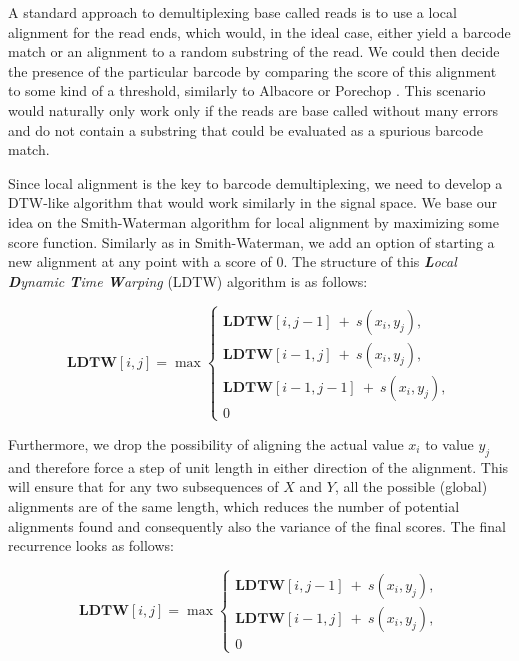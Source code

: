 A standard approach to demultiplexing base called reads is to use a local alignment for the read ends, which would, in the ideal case, either yield a barcode match or an alignment to a random substring of the read. We could then decide the presence of the particular barcode by comparing the score of this alignment to some kind of a threshold, similarly to Albacore or Porechop \cite{Porechop}. This scenario would naturally only work only if the reads are base called without many errors and do not contain a substring that could be evaluated as a spurious barcode match.

Since local alignment is the key to barcode demultiplexing, we need to develop a DTW-like algorithm that would work similarly in the signal space. We base our idea on the Smith-Waterman algorithm for local alignment by maximizing some score function. Similarly as in Smith-Waterman, we add an option of starting a new alignment at any point with a score of $0$. The structure of this \textit{\textbf{L}ocal \textbf{D}ynamic \textbf{T}ime \textbf{W}arping} (LDTW) algorithm is as follows:

\begin{equation}
    \textbf{LDTW}[i, j] = \max
        \begin{cases}
            \textbf{LDTW}[i, j - 1] ~+~ s(x_i, y_j),\\
            \textbf{LDTW}[i - 1, j] ~+~ s(x_i, y_j),\\
            \textbf{LDTW}[i - 1, j - 1] ~+~ s(x_i, y_j),\\
            0
        \end{cases}
    \label{eq:ldtw_recurrence}
\end{equation}

Furthermore, we drop the possibility of aligning the actual value $x_i$ to value $y_j$ and therefore force a step of unit length in either direction of the alignment. This will ensure that for any two subsequences of $X$ and $Y$, all the possible  (global) alignments are of the same length, which reduces the number of potential alignments found  and consequently also the variance of the final scores. The final recurrence looks as follows:

\begin{equation}
    \textbf{LDTW}[i, j] = \max
        \begin{cases}
            \textbf{LDTW}[i, j - 1] ~+~ s(x_i, y_j),\\
            \textbf{LDTW}[i - 1, j] ~+~ s(x_i, y_j),\\
            0
        \end{cases}
    \label{eq:ldtw_recurrence_corrected}
\end{equation}

